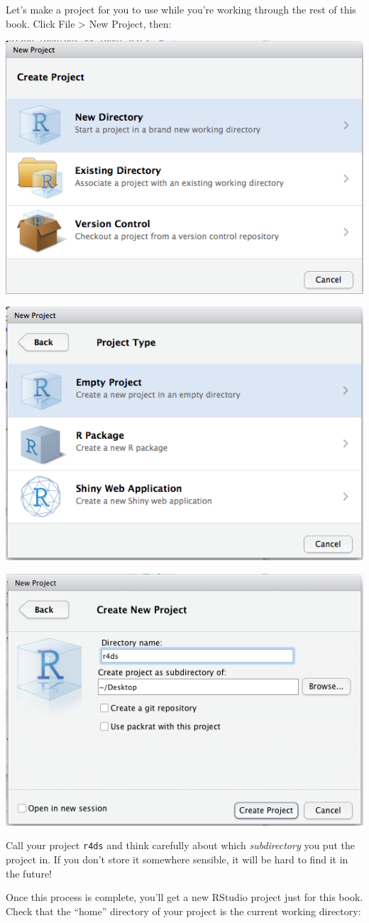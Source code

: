 \documentclass[letterpaper,12pt,twoside,]{pinp}
\begin{document}
Let's make a project for you to use while you're working through the
rest of this book. Click File \textgreater{} New Project, then:

\begin{center}\includegraphics[width=0.5\linewidth]{screenshots/rstudio-project-1} \end{center}

\begin{center}\includegraphics[width=0.5\linewidth]{screenshots/rstudio-project-2} \end{center}

\begin{center}\includegraphics[width=0.5\linewidth]{screenshots/rstudio-project-3} \end{center}

Call your project \texttt{r4ds} and think carefully about which
\emph{subdirectory} you put the project in. If you don't store it
somewhere sensible, it will be hard to find it in the future!

Once this process is complete, you'll get a new RStudio project just for
this book. Check that the ``home'' directory of your project is the
current working directory:
\end{document}
